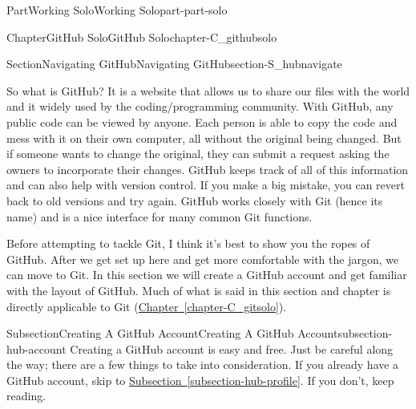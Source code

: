 \documentclass[oneside,10pt,]{book}
\newcommand{\xreffont}{\relax}
\begin{document}
\begin{partptx}{Part}{Working Solo}{}{Working Solo}{}{}{part-part-solo}
\renewcommand*{\partname}{Part}
%
\typeout{************************************************}
\typeout{************************************************}
%
\begin{chapterptx}{Chapter}{GitHub Solo}{}{GitHub Solo}{}{}{chapter-C_githubsolo}
\renewcommand*{\chaptername}{Chapter}
%
%
\typeout{************************************************}
\typeout{************************************************}
%
\begin{sectionptx}{Section}{Navigating GitHub}{}{Navigating GitHub}{}{}{section-S_hubnavigate}
%
%
\begin{introduction}{}%
So what is GitHub? It is a website that allows us to share our files with the world and it widely used by the coding\slash{}programming community. With GitHub, any public code can be viewed by anyone. Each person is able to copy the code and mess with it on their own computer, all without the original being changed. But if someone wants to change the original, they can submit a request asking the owners to incorporate their changes. GitHub keeps track of all of this information and can also help with version control. If you make a big mistake, you can revert back to old versions and try again. GitHub works closely with Git (hence its name) and is a nice interface for many common Git functions.%
\par
Before attempting to tackle Git, I think it's best to show you the ropes of GitHub. After we get set up here and get more comfortable with the jargon, we can move to Git. In this section we will create a GitHub account and get familiar with the layout of GitHub. Much of what is said in this section and chapter is directly applicable to Git (\hyperref[chapter-C_gitsolo]{Chapter~{\xreffont\ref{chapter-C_gitsolo}}}).%
\end{introduction}%
%
%
\typeout{************************************************}
\typeout{************************************************}
%
\begin{subsectionptx}{Subsection}{Creating A GitHub Account}{}{Creating A GitHub Account}{}{}{subsection-hub-account}
%
%
Creating a GitHub account is easy and free. Just be careful along the way; there are a few things to take into consideration. If you already have a GitHub account, skip to \hyperref[subsection-hub-profile]{Subsection~{\xreffont\ref{subsection-hub-profile}}}. If you don't, keep reading.%

\end{subsectionptx}
\end{sectionptx}
\end{chapterptx}
\end{partptx}
\end{document}
